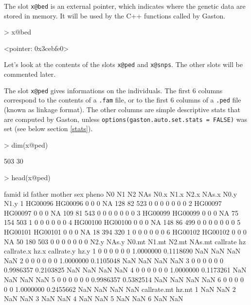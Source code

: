 \documentclass{article}
\renewenvironment{Schunk}{\vspace{\topsep}}{\vspace{\topsep}}
\begin{document}
  The slot \verb!x@bed! is an external pointer, which indicates where the genetic data are stored in
  memory. It will be used by the C++ functions called by Gaston. 
\begin{Schunk}
\begin{Sinput}
> x@bed
\end{Sinput}
\begin{Soutput}
<pointer: 0x3cebfe0>
\end{Soutput}
\end{Schunk}

  Let's look at the contents of the slots \verb!x@ped! and \verb!x@snps!.
  The other slots will be commented later.

  The slot \verb!x@ped! gives informations on the individuals. 
  The first 6 columns correspond to the contents of a \verb!.fam! file, or to the first 6 columns of a \verb!.ped! file 
  (known as linkage format). The other columns are simple descriptive
  stats that are computed by Gaston, unless \verb!options(gaston.auto.set.stats = FALSE)!
  was set (see below section \ref{stats}).

\begin{Schunk}
\begin{Sinput}
> dim(x@ped)
\end{Sinput}
\begin{Soutput}
[1] 503  30
\end{Soutput}
\begin{Sinput}
> head(x@ped)
\end{Sinput}
\begin{Soutput}
    famid      id father mother sex pheno  N0  N1  N2 NAs N0.x N1.x N2.x NAs.x N0.y N1.y
1 HG00096 HG00096      0      0   0    NA 128  82 523   0    0    0    0     0    0    0
2 HG00097 HG00097      0      0   0    NA 109  81 543   0    0    0    0     0    0    0
3 HG00099 HG00099      0      0   0    NA  75 154 503   1    0    0    0     0    0    0
4 HG00100 HG00100      0      0   0    NA 148  86 499   0    0    0    0     0    0    0
5 HG00101 HG00101      0      0   0    NA  18 394 320   1    0    0    0     0    0    0
6 HG00102 HG00102      0      0   0    NA  50 180 503   0    0    0    0     0    0    0
  N2.y NAs.y N0.mt N1.mt N2.mt NAs.mt  callrate        hz callrate.x hz.x callrate.y hz.y
1    0     0     0     0     0      0 1.0000000 0.1118690        NaN  NaN        NaN  NaN
2    0     0     0     0     0      0 1.0000000 0.1105048        NaN  NaN        NaN  NaN
3    0     0     0     0     0      0 0.9986357 0.2103825        NaN  NaN        NaN  NaN
4    0     0     0     0     0      0 1.0000000 0.1173261        NaN  NaN        NaN  NaN
5    0     0     0     0     0      0 0.9986357 0.5382514        NaN  NaN        NaN  NaN
6    0     0     0     0     0      0 1.0000000 0.2455662        NaN  NaN        NaN  NaN
  callrate.mt hz.mt
1         NaN   NaN
2         NaN   NaN
3         NaN   NaN
4         NaN   NaN
5         NaN   NaN
6         NaN   NaN
\end{Soutput}
\end{Schunk}
\end{document}

